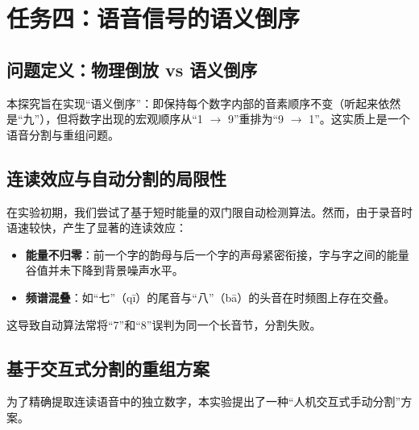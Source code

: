 \documentclass[12pt]{ctexart}
\begin{document}



\section{任务四：语音信号的语义倒序}

\subsection{问题定义：物理倒放 vs 语义倒序}

本探究旨在实现“语义倒序”：即保持每个数字内部的音素顺序不变（听起来依然是“九”），但将数字出现的宏观顺序从“1 $\to$ 9”重排为“9 $\to$ 1”。这实质上是一个语音分割与重组问题。

\subsection{连读效应与自动分割的局限性}
在实验初期，我们尝试了基于短时能量的双门限自动检测算法。然而，由于录音时语速较快，产生了显著的连读效应：
\begin{itemize}
    \item \textbf{能量不归零}：前一个字的韵母与后一个字的声母紧密衔接，字与字之间的能量谷值并未下降到背景噪声水平。
    \item \textbf{频谱混叠}：如“七”（qī）的尾音与“八”（bā）的头音在时频图上存在交叠。
\end{itemize}
这导致自动算法常将“7”和“8”误判为同一个长音节，分割失败。

\subsection{基于交互式分割的重组方案}
为了精确提取连读语音中的独立数字，本实验提出了一种“人机交互式手动分割”方案。
\end{document}
